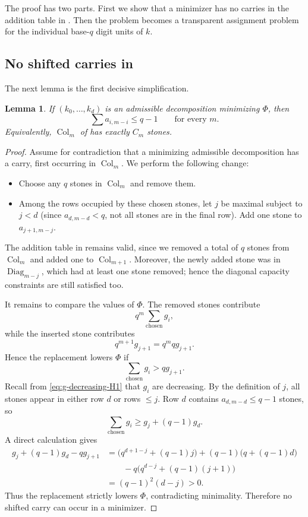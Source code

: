 \documentclass[11pt]{amsart}
\newtheorem{lemma}[theorem]{Lemma}
\theoremstyle{definition}
\theoremstyle{remark}
\DeclareMathOperator{\Col}{Col}
\DeclareMathOperator{\Diag}{Diag}
\begin{document}
The proof has two parts.
First we show that a minimizer has no carries in the addition table in .
Then the problem becomes a transparent assignment problem for the individual base-$q$ digit units of $k$.

\subsection{No shifted carries in }
The next lemma is the first decisive simplification.
\begin{lemma}\label{lem:H1-carry-elimination}
  If $(k_0,\ldots,k_d)$ is an admissible decomposition minimizing $\Phi$, then
  \[ \sum a_{i,m-i} \leq q-1\qquad\text{for every }m.  \]
  Equivalently, $\Col_m$ of  has exactly $C_m$ stones.
\end{lemma}
\begin{proof}
Assume for contradiction that a minimizing admissible decomposition has a carry,
first occurring in $\Col_m$.
We perform the following change:
\begin{itemize}
  \item Choose any $q$ stones in $\Col_m$ and remove them.
  \item Among the rows occupied by these chosen stones,
    let $j$ be maximal subject to $j<d$
    (since $a_{d,m-d} < q$, not all stones are in the final row).
    Add one stone to $a_{j+1,m-j}$.
\end{itemize}
The addition table in  remains valid,
since we removed a total of $q$ stones from $\Col_m$ and added one to $\Col_{m+1}$.
Moreover, the newly added stone was in $\Diag_{m-j}$,
which had at least one stone removed;
hence the diagonal capacity constraints are still satisfied too.

It remains to compare the values of $\Phi$.
The removed stones contribute
\[
  q^m\sum_{\text{chosen}}g_i,
\]
while the inserted stone contributes
\[
  q^{m+1}g_{j+1}=q^m qg_{j+1}.
\]
Hence the replacement lowers $\Phi$ if
\begin{equation}\label{eq:H1-Phi-ineq}
  \sum_{\text{chosen}}g_i > qg_{j+1}.
\end{equation}
Recall from \eqref{eq:g-decreasing-H1} that $g_i$ are decreasing.
By the definition of $j$, all stones appear in either row $d$ or rows $\le j$.
Row $d$ contains $a_{d,m-d} \le q-1$ stones, so
\[ \sum_{\text{chosen}}g_i \ge  g_j+(q-1)g_d.  \]
A direct calculation gives
\begin{align*}
  g_j+(q-1)g_d-qg_{j+1}
  &=\bigl(q^{d+1-j}+(q-1)j\bigr)
    +(q-1)\bigl(q+(q-1)d\bigr)\\
  &\qquad -q\bigl(q^{d-j}+(q-1)(j+1)\bigr)\\
  &=(q-1)^2(d-j)>0.
\end{align*}
Thus the replacement strictly lowers $\Phi$, contradicting minimality.
Therefore no shifted carry can occur in a minimizer.
\end{proof}
\end{document}
